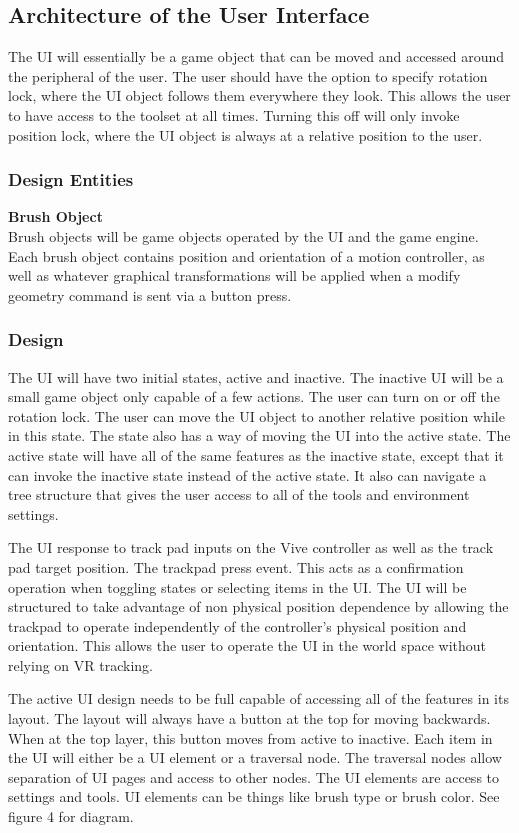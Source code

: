 \documentclass[onecolumn, draftclsnofoot,10pt, compsoc]{IEEEtran}
\begin{document}
\subsection{Architecture of the User Interface}
The UI will essentially be a game object that can be moved and accessed around the peripheral of the user. The user should have the option to specify rotation lock, where the UI object follows them everywhere they look. This allows the user to have access to the toolset at all times. Turning this off will only invoke position lock, where the UI object is always at a relative position to the user. 

\subsubsection{Design Entities}
\textbf{Brush Object} \\
Brush objects will be game objects operated by the UI and the game engine. Each brush object contains position and orientation of a motion controller, as well as whatever graphical transformations will be applied when a modify geometry command is sent via a button press.

\subsubsection{Design}
The UI will have two initial states, active and inactive. The inactive UI will be a small game object only capable of a few actions. The user can turn on or off the rotation lock. The user can move the UI object to another relative position while in this state. The state also has a way of moving the UI into the active state. 
The active state will have all of the same features as the inactive state, except that it can invoke the inactive state instead of the active state. It also can navigate a tree structure that gives the user access to all of the tools and environment settings. 

The UI response to track pad inputs on the Vive controller as well as the track pad target position. The trackpad press event. This acts as a confirmation operation when toggling states or selecting items in the UI. The UI will be structured to take advantage of non physical position dependence by allowing the trackpad to operate independently of the controller's physical position and orientation. This allows the user to operate the UI in the world space without relying on VR tracking.

The active UI design needs to be full capable of accessing all of the features in its layout. The layout will always have a button at the top for moving backwards. When at the top layer, this button moves from active to inactive. Each item in the UI will either be a UI element or a traversal node. The traversal nodes allow separation of UI pages and access to other nodes. The UI elements are access to settings and tools. UI elements can be things like brush type or brush color. See figure 4 for diagram.
\end{document}
